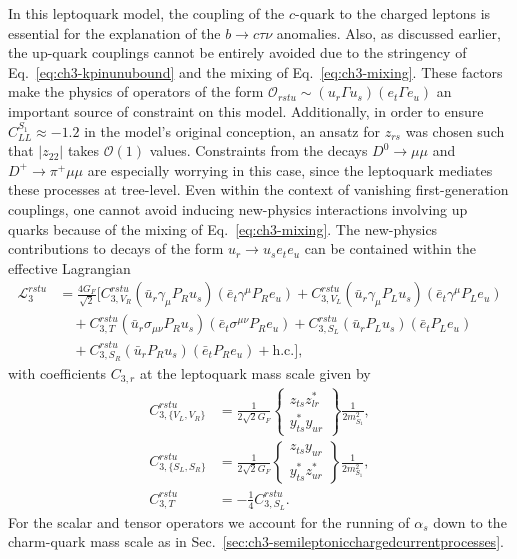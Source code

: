 In this leptoquark model, the coupling of the $c$-quark to the charged leptons
is essential for the explanation of the $b \to c \tau \nu$ anomalies. Also, as
discussed earlier, the up-quark couplings cannot be entirely avoided due to the
stringency of Eq.~\eqref{eq:ch3-kpinunubound} and the mixing of
Eq.~\eqref{eq:ch3-mixing}. These factors make the physics of operators of the form
$\mathscr{O}_{rstu} \sim (u_r \Gamma u_s) (e_t \Gamma e_u)$ an important
source of constraint on this model. Additionally, in order to ensure
$C_{LL}^{S_{1}} \approx -1.2$ in the model's original conception, an ansatz for
$z_{rs}$ was chosen such that $|z_{22}|$ takes $\mathscr{O}(1)$ values.
Constraints from the decays $D^0 \rightarrow \mu \mu$ and $D^+ \rightarrow \pi^+
\mu \mu$ are especially worrying in this case, since the leptoquark mediates
these processes at tree-level. Even within the context of vanishing
first-generation couplings, one cannot avoid inducing new-physics interactions
involving up quarks because of the mixing of Eq.~\eqref{eq:ch3-mixing}. The
new-physics contributions to decays of the form $u_r \to u_s e_t e_u$ can
be contained within the effective Lagrangian
\begin{equation}
  \label{eq:ch3-charm-lag}
  \begin{split}
    \mathscr{L}_3^{rstu}
    &= \frac{4 G_F}{\sqrt{2}} \bigg[  C^{rstu}_{3, V_{R}}  (\bar{u}_r \gamma_\mu P_R u_s)(\bar{e}_t \gamma^\mu P_R e_u) + C_{3, V_{L}}^{rstu} (\bar{u}_r \gamma_\mu P_L u_s)(\bar{e}_t \gamma^\mu P_L e_u)\\ &\quad + C_{3, T}^{rstu} (\bar{u}_r \sigma_{\mu\nu} P_R u_s)(\bar{e}_t \sigma^{\mu\nu} P_R e_u) + C_{3, S_L}^{rstu} (\bar{u}_r P_L u_s)(\bar{e}_t P_L e_u)\\ &\quad + C_{3, S_R}^{rstu}(\bar{u}_r P_R u_s)(\bar{e}_t P_R e_u) + \text{h.c.}
    \bigg],
  \end{split}
\end{equation}
with coefficients $C_{3,r}$ at the leptoquark mass scale given by
\begin{align}
  C_{3,\{V_L,V_R\}}^{rstu} &= \frac{1}{2\sqrt{2} G_F} \left\{ \begin{matrix} z_{ts}z_{lr}^*\\ y^*_{ts} y_{ur} \end{matrix}  \right\} \frac{1}{2 m_{S_{1}}^2},\\
  C_{3,\{S_L,S_R\}}^{rstu} &= \frac{1}{2\sqrt{2} G_F} \left\{ \begin{matrix} z_{ts}y_{ur}\\ y^*_{ts} z^*_{ur} \end{matrix}  \right\} \frac{1}{2 m_{S_{1}}^2},\\
  C_{3,T}^{rstu} &= -\frac{1}{4} C^{rstu}_{3,S_L}.
\end{align}
For the scalar and tensor operators we account for the running of $\alpha_s$
down to the charm-quark mass scale as in
Sec.~\ref{sec:ch3-semileptonicchargedcurrentprocesses}.

